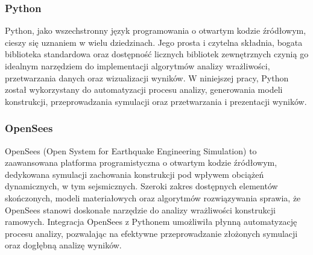 \subsubsection{Python}

Python, jako wszechstronny język programowania o otwartym kodzie źródłowym, cieszy się uznaniem w wielu dziedzinach\cite{python}.
Jego prosta i czytelna składnia, bogata biblioteka standardowa oraz dostępność licznych bibliotek zewnętrznych czynią go idealnym narzędziem do implementacji algorytmów analizy wrażliwości, przetwarzania danych oraz wizualizacji wyników.
W niniejszej pracy, Python został wykorzystany do automatyzacji procesu analizy, generowania modeli konstrukcji, przeprowadzania symulacji oraz przetwarzania i prezentacji wyników.

\subsubsection{OpenSees}

OpenSees (Open System for Earthquake Engineering Simulation) to zaawansowana platforma programistyczna o otwartym kodzie źródłowym, dedykowana symulacji zachowania konstrukcji pod wpływem obciążeń dynamicznych, w tym sejsmicznych\cite{opensees}.
Szeroki zakres dostępnych elementów skończonych, modeli materiałowych oraz algorytmów rozwiązywania sprawia, że OpenSees stanowi doskonałe narzędzie do analizy wrażliwości konstrukcji ramowych.
Integracja OpenSees z Pythonem umożliwiła płynną automatyzację procesu analizy, pozwalając na efektywne przeprowadzanie złożonych symulacji oraz dogłębną analizę wyników.